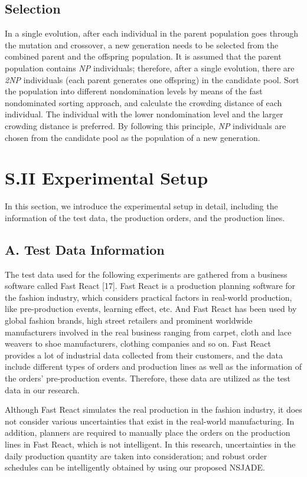 \documentclass[journal]{IEEEtran}
\theoremstyle{definition}
\begin{document}
\subsection{Selection}
In a single evolution, after each individual in the parent population goes through the mutation and crossover, a new generation needs to be selected from the combined parent and the offspring population. It is assumed that the parent population contains \emph{NP} individuals; therefore, after a single evolution, there are \emph{2NP} individuals (each parent generates one offspring) in the candidate pool. Sort the population into different nondomination levels by means of the fast nondominated sorting approach, and calculate the crowding distance of each individual. The individual with the lower nondomination level and the larger crowding distance is preferred. By following this principle, \emph{NP} individuals are chosen from the candidate pool as the population of a new generation.

\section*{S.II Experimental Setup}
In this section, we introduce the experimental setup in detail, including the information of the test data, the production orders, and the production lines.

\subsection*{A. Test Data Information}
The test data used for the following experiments are gathered from a business software called Fast React [17]. Fast React is a production planning software for the fashion industry, which considers practical factors in real-world production, like pre-production events, learning effect, etc. And Fast React has been used by global fashion brands, high street retailers and prominent worldwide manufacturers involved in the real business ranging from carpet, cloth and lace weavers to shoe manufacturers, clothing companies and so on. Fast React provides a lot of industrial data collected from their customers, and the data include different types of orders and production lines as well as the information of the orders' pre-production events. Therefore, these data are utilized as the test data in our research.

Although Fast React simulates the real production in the fashion industry, it does not consider various uncertainties that exist in the real-world manufacturing. In addition, planners are required to manually place the orders on the production lines in Fast React, which is not intelligent. In this research, uncertainties in the daily production quantity are taken into consideration; and robust order schedules can be intelligently obtained by using our proposed NSJADE.
\end{document}
